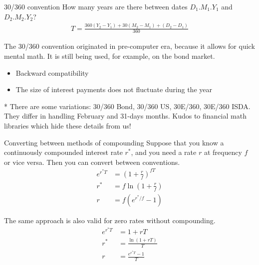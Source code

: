 \documentclass{beamer}
\begin{document}
\begin{frame}{30/360 convention}
\justify
How many years are there between dates $D_1.M_1.Y_1$ and $D_2.M_2.Y_2$?
\begin{align*}
T = \frac{360(Y_2-Y_1) + 30(M_2-M_1) + (D_2-D_1)}{360}
\end{align*}

\justify
The 30/360 convention originated in pre-computer era, because it allows for quick mental math. It is still being used, for example, on the bond market.
\begin{itemize}
\item Backward compatibility
\item The size of interest payments does not fluctuate during the year
\end{itemize}

\vspace{\baselineskip}
\justify
* There are some variations: 30/360 Bond, 30/360 US, 30E/360, 30E/360 ISDA. They differ in handling February and 31-days months. Kudos to financial math libraries which hide these details from us!
\end{frame}



\begin{frame}{Converting between methods of compounding}
\justify
Suppose that you know a continuously compounded interest rate $r^*$, and you need a rate $r$ at frequency $f$ or vice versa. Then you can convert between conventions.
\begin{align*}
e^{r^*T} &= \left(1 + \frac{r}{f}\right)^{fT} \\
r^* &= f\ln \left(1 + \frac{r}{f}\right) \\
r &= f\left(e^{r^*/f} - 1\right)
\end{align*}

\justify
The same approach is also valid for zero rates without compounding.
\begin{align*}
e^{r^*T} &= 1+rT \\
r^* &= \frac{\ln(1+rT)}{T} \\
r &= \frac{e^{r^*T}-1}{T}
\end{align*}

\end{frame}
\end{document}
